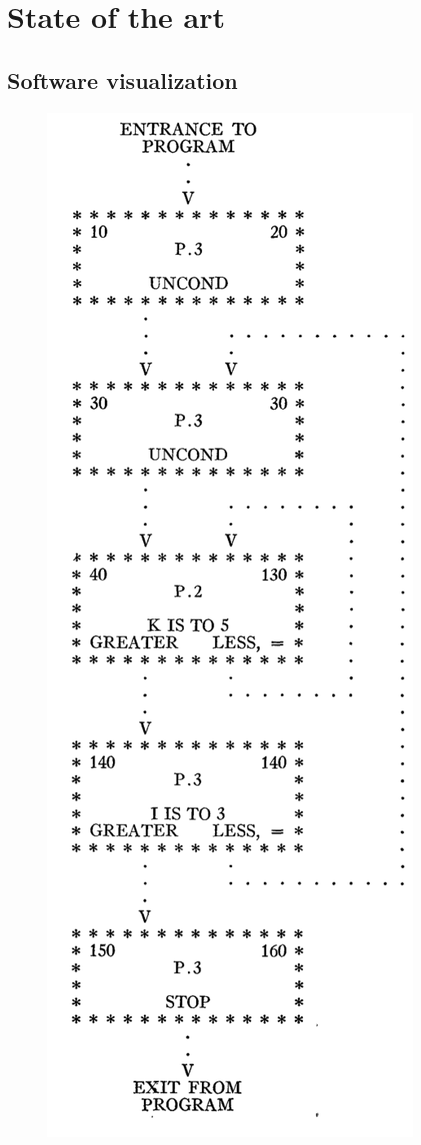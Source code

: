
\chapter[Related Works]{State of the art}
\graphicspath{ {images/stateOfArt} }



\section{Software visualization}


\begin{figure}
  \centering
  \includegraphics[width=0.9\linewidth]{Haibt1959_Flowchart.png} 

\end{figure}
